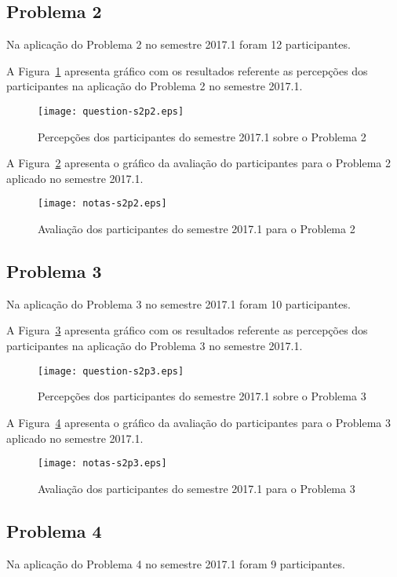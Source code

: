\subsection{Problema 2}
Na aplicação do Problema 2 no semestre 2017.1 foram 12 participantes.

A Figura~\ref{percep-s2p2} apresenta gráfico com os resultados referente
as percepções dos participantes na aplicação do
Problema 2 no semestre 2017.1.

\begin{figure}[!htb]
\centering
\texttt{[image: question-s2p2.eps]}
\caption{Percepções dos participantes do semestre 2017.1 sobre o Problema 2}
\label{percep-s2p2}
\end{figure}

A Figura~\ref{aval-s2p2} apresenta o gráfico da
avaliação do participantes para o Problema 2 aplicado no semestre 2017.1.

\begin{figure}[!htb]
\centering
\texttt{[image: notas-s2p2.eps]}
\caption{Avaliação dos participantes do semestre 2017.1 para o Problema 2}
\label{aval-s2p2}
\end{figure}

\subsection{Problema 3}
Na aplicação do Problema 3 no semestre 2017.1 foram 10 participantes.

A Figura~\ref{percep-s2p3} apresenta gráfico com os resultados referente
as percepções dos participantes na aplicação do
Problema 3 no semestre 2017.1.

\begin{figure}[!htb]
\centering
\texttt{[image: question-s2p3.eps]}
\caption{Percepções dos participantes do semestre 2017.1 sobre o Problema 3}
\label{percep-s2p3}
\end{figure}

A Figura~\ref{aval-s2p3} apresenta o gráfico da
avaliação do participantes para o Problema 3 aplicado no semestre 2017.1.

\begin{figure}[!htb]
\centering
\texttt{[image: notas-s2p3.eps]}
\caption{Avaliação dos participantes do semestre 2017.1 para o Problema 3}
\label{aval-s2p3}
\end{figure}

\subsection{Problema 4}
Na aplicação do Problema 4 no semestre 2017.1 foram 9 participantes.

